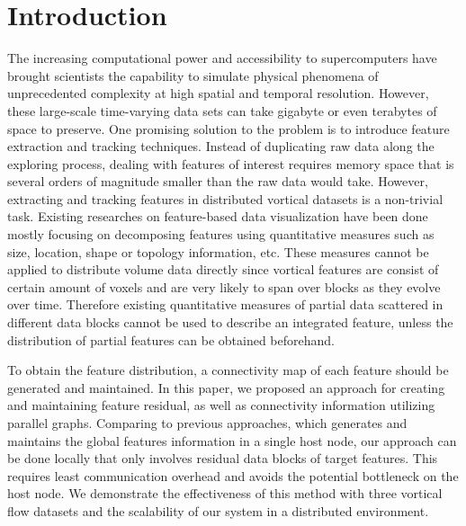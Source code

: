 \documentclass[10pt, conference, compsocconf]{IEEEtran}
\begin{document}
\section{Introduction}
The increasing computational power and accessibility to supercomputers have brought scientists the capability to simulate physical phenomena of unprecedented complexity at high spatial and temporal resolution. However, these large-scale time-varying data sets can take gigabyte or even terabytes of space to preserve. One promising solution to the problem is to introduce feature extraction and tracking techniques. Instead of duplicating raw data along the exploring process, dealing with features of interest requires memory space that is several orders of magnitude smaller than the raw data would take.
However, extracting and tracking features in distributed vortical datasets is a non-trivial task. Existing researches on feature-based data visualization have been done mostly focusing on decomposing features using quantitative measures such as size, location, shape or topology information, etc. These measures cannot be applied to distribute volume data directly since vortical features are consist of certain amount of voxels and are very likely to span over blocks as they evolve over time. Therefore existing quantitative measures of partial data scattered in different data blocks cannot be used to describe an integrated feature, unless the distribution of partial features can be obtained beforehand. 

To obtain the feature distribution, a connectivity map of each feature should be generated and maintained. In this paper, we proposed an approach for creating and maintaining feature residual, as well as connectivity information utilizing parallel graphs. Comparing to previous approaches, which generates and maintains the global features information in a single host node, our approach can be done locally that only involves residual data blocks of target features. This requires least communication overhead and avoids the potential bottleneck on the host node. We demonstrate the effectiveness of this method with three vortical flow datasets and the scalability of our system in a distributed environment.

\end{document}
